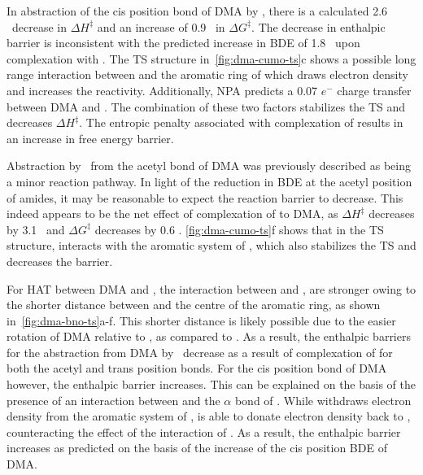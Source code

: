 In abstraction of the cis position  bond of DMA by \cumo, there is a
calculated 2.6 \kcalmol\ decrease in $\Delta H^\ddagger$ and an increase of 0.9
\kcalmol\ in $\Delta G^\ddagger$. The decrease in enthalpic barrier is
inconsistent with the predicted increase in BDE of 1.8 \kcalmol\ upon
complexation with . The TS structure in~\ref{fig:dma-cumo-ts}c shows a
possible long range interaction between  and the aromatic ring of
\cumo which draws electron density and increases the reactivity. Additionally,
NPA predicts a 0.07 $e^-$ charge transfer between DMA and . The
combination of these two factors stabilizes the TS and decreases $\Delta
H^\ddagger$. The entropic penalty associated with complexation of 
results in an increase in free energy barrier.

Abstraction by \cumo\ from the acetyl  bond of DMA was previously
described as being a minor reaction pathway.\cite{Salamone2013} In light of the
reduction in BDE at the acetyl position of amides, it may be reasonable to
expect the reaction barrier to decrease. This indeed appears to be the net
effect of complexation of  to DMA, as $\Delta H^\ddagger$ decreases by
3.1 \kcalmol\ and $\Delta G^\ddagger$ decreases by 0.6 \kcalmol.
\ref{fig:dma-cumo-ts}f shows that in the TS structure,  interacts with
the aromatic system of \cumo, which also stabilizes the TS and decreases the
barrier.

For HAT between DMA and \bno, the interaction between  and \bno, are
stronger owing to the shorter distance between  and the centre of the
aromatic ring, as shown in~\ref{fig:dma-bno-ts}a-f. This shorter distance is
likely possible due to the easier rotation of DMA relative to \bno, as compared
to \cumo. As a result, the enthalpic barriers for the abstraction from DMA by
\bno\ decrease as a result of complexation of  for both the acetyl and
trans position  bonds. For the cis position  bond of DMA
however, the enthalpic barrier increases. This can be explained on the basis of
the presence of an interaction between  and the $\alpha$ bond
of \bno. While  withdraws electron density from the aromatic system of
\bno,  is able to donate electron density back to \bno, counteracting
the effect of the interaction of . As a result, the enthalpic barrier
increases as predicted on the basis of the increase of the cis position
 BDE of DMA.

